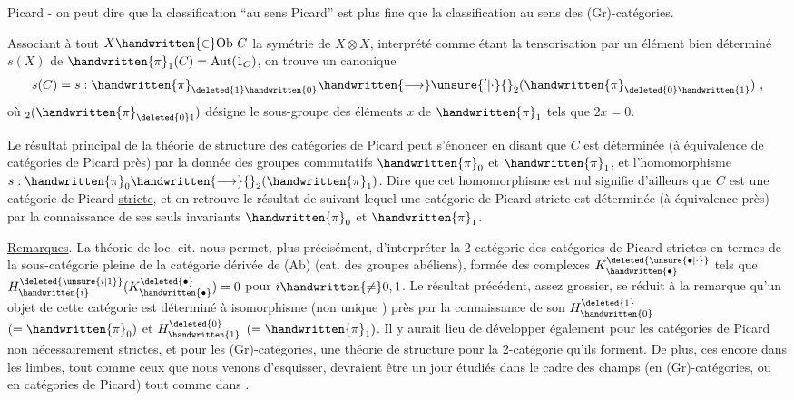 
Picard - on peut dire que la classification ``au sens Picard'' est plus fine que la classification au sens des (Gr)-catégories. 

Associant à tout $X\handwritten{\in}\mathrm{Ob}\ C$ la symétrie de $X\otimes X$, interprété comme  étant la tensorisation par un élément bien déterminé $s(X)$ de $\handwritten{\pi}_{1}(C)=\mathrm{Aut}(1_C)$, on trouve un  canonique
\[
s(C)=s:\handwritten{\pi}_{\deleted{1}\handwritten{0}}\handwritten{\longrightarrow}\unsure{{}'|\cdot}{}_{2}(\handwritten{\pi}_{\deleted{0}\handwritten{1}})\ ,
\]
où $ {}_{2}(\handwritten{\pi}_{\deleted{0}1})$ désigne le sous-groupe des éléments $x$ de $\handwritten{\pi}_{1}$ tels que $2x=0$.

Le résultat principal de la théorie de structure des catégories de Picard peut s'énoncer en disant que $C$ est déterminée (à équivalence  de catégories de Picard près) par la donnée des groupes commutatifs $\handwritten{\pi}_{0}$ et $\handwritten{\pi}_{1}$, et l'homomorphisme $s:\handwritten{\pi}_{0}\handwritten{\longrightarrow}{}_{2}(\handwritten{\pi}_{1})$. Dire que cet homomorphisme est nul signifie d'ailleurs que $C$ est une catégorie de Picard \uline{stricte}, et on retrouve le résultat de \handwritten{[\, ]} suivant lequel une catégorie de Picard stricte est déterminée (à équivalence près) par la connaissance de ses seuls invariants $\handwritten{\pi}_{0}$ et $\handwritten{\pi}_{1}$.

\uline{Remarques}. La théorie de loc. cit. nous permet, plus précisément, d'interpréter la 2-catégorie des catégories de Picard strictes en termes de la sous-catégorie pleine de la catégorie dérivée de (Ab) (cat. des groupes abéliens), formée des complexes $K^{\deleted{\unsure{\bullet|\cdot}}}_{\handwritten{\bullet}}$ tels que $H^{\deleted{\unsure{i|1}}}_{\handwritten{i}}(K^{\deleted{\bullet}}_{\handwritten{\bullet}})=0$ pour $i\handwritten{\ne}0,1$. Le résultat précédent, assez grossier, se réduit  à la remarque qu'un objet de cette catégorie est déterminé à isomorphisme (non unique \handwritten{!}) près par la connaissance de son $H^{\deleted{1}}_{\handwritten{0}}$ $(=\handwritten{\pi}_{0})$ et $H^{\deleted{0}}_{\handwritten{1}}$ $(=\handwritten{\pi}_{1})$. Il y aurait lieu de développer également pour les catégories de Picard non nécessairement strictes, et pour les (Gr)-catégories, une théorie de structure pour la 2-catégorie qu'ils forment. De plus, ces  encore dans les limbes, tout comme ceux que  nous venons d'esquisser, devraient être un jour  étudiés dans le cadre des champs (en (Gr)-catégories, ou en catégories de Picard) tout comme dans  \handwritten{[\, ]}.

